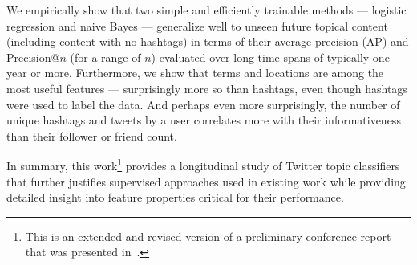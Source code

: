 We empirically show that two simple and efficiently trainable methods ---
logistic regression and naive Bayes --- generalize well to unseen
future topical content (including content with no hashtags) in terms
of their average precision (AP) and Precision@$n$ (for a range of
$n$) evaluated over long time-spans of typically one year or more.  
Furthermore, we show that terms and locations are among the most
useful features --- surprisingly more so than hashtags, even though
hashtags were used to label the data.  And perhaps even more
surprisingly, the number of unique hashtags and tweets by a user
correlates more with their informativeness than their follower or
friend count.  

In summary, this work\footnote{This is an extended and revised version of a preliminary conference report that was presented in~\cite{Iman2017}.} provides a longitudinal study of Twitter topic classifiers that further justifies supervised approaches used in existing work while providing detailed insight into feature properties critical for their performance.


%
%




